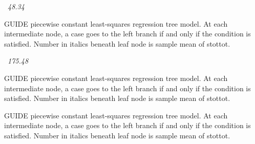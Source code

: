 \documentclass[12pt]{article}
\begin{document}
 \begin{center}
    ~{\textit{48.34}}
 \end{center}
GUIDE piecewise constant least-squares regression tree model.
At each intermediate node, a case goes to the left branch 
  if and only if the condition is satisfied.
Number in italics beneath leaf node is sample mean of stottot.
 \begin{center}
    ~{\textit{175.48}}
 \end{center}
GUIDE piecewise constant least-squares regression tree model.
At each intermediate node, a case goes to the left branch 
  if and only if the condition is satisfied.
Number in italics beneath leaf node is sample mean of stottot.
 \begin{center}
 \end{center}
GUIDE piecewise constant least-squares regression tree model.
At each intermediate node, a case goes to the left branch 
  if and only if the condition is satisfied.
Number in italics beneath leaf node is sample mean of stottot.


\end{document}
